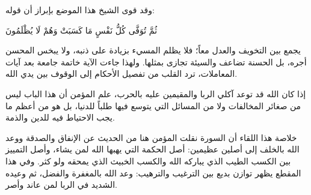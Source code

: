 وقد قوى الشيخ هذا الموضع بإبراز أن قوله: \begin{ayah}ثُمَّ تُوَفَّى كُلُّ نَفْسٍ مَا كَسَبَتْ وَهُمْ لَا يُظْلَمُونَ\end{ayah} يجمع بين التخويف والعدل معاً؛ فلا يظلم المسيء بزيادة على ذنبه، ولا يبخس المحسن أجره، بل الحسنة تضاعف والسيئة تجازى بمثلها. ولهذا جاءت الآية خاتمة جامعة بعد آيات المعاملات، ترد القلب من تفصيل الأحكام إلى الوقوف بين يدي الله.

\begin{fawaid}
إذا كان الله قد توعد آكلي الربا والمقيمين عليه بالحرب، علم المؤمن أن هذا الباب ليس من صغائر المخالفات ولا من المسائل التي يتوسع فيها طلباً للدنيا، بل هو من أعظم ما يجب الاحتياط فيه للدين والذمة.
\end{fawaid}

\separator

خلاصة هذا اللقاء أن السورة نقلت المؤمن هنا من الحديث عن الإنفاق والصدقة ووعد الله بالخلف إلى أصلين عظيمين: أصل الحكمة التي يهبها الله لمن يشاء، وأصل التمييز بين الكسب الطيب الذي يباركه الله والكسب الخبيث الذي يمحقه ولو كثر. وفي هذا المقطع يظهر توازن بديع بين الترغيب والترهيب: وعد الله بالمغفرة والفضل، ثم وعيده الشديد في الربا لمن عاند وأصر.

